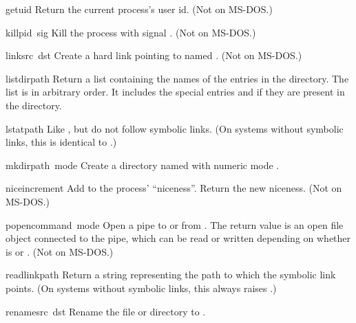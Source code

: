 \begin{funcdesc}{getuid}{}
Return the current process's user id.
(Not on MS-DOS.)
\end{funcdesc}

\begin{funcdesc}{kill}{pid\, sig}
Kill the process  with signal .
(Not on MS-DOS.)
\end{funcdesc}

\begin{funcdesc}{link}{src\, dst}
Create a hard link pointing to  named .
(Not on MS-DOS.)
\end{funcdesc}

\begin{funcdesc}{listdir}{path}
Return a list containing the names of the entries in the directory.
The list is in arbitrary order.  It includes the special entries
 and  if they are present in the directory.
\end{funcdesc}

\begin{funcdesc}{lstat}{path}
Like , but do not follow symbolic links.  (On systems
without symbolic links, this is identical to .)
\end{funcdesc}

\begin{funcdesc}{mkdir}{path\, mode}
Create a directory named  with numeric mode .
\end{funcdesc}

\begin{funcdesc}{nice}{increment}
Add  to the process' ``niceness''.  Return the new niceness.
(Not on MS-DOS.)
\end{funcdesc}

\begin{funcdesc}{popen}{command\, mode}
Open a pipe to or from .  The return value is an open
file object connected to the pipe, which can be read or written
depending on whether  is  or .
(Not on MS-DOS.)
\end{funcdesc}

\begin{funcdesc}{readlink}{path}
Return a string representing the path to which the symbolic link
points.  (On systems without symbolic links, this always raises
.)
\end{funcdesc}

\begin{funcdesc}{rename}{src\, dst}
Rename the file or directory  to .
\end{funcdesc}

